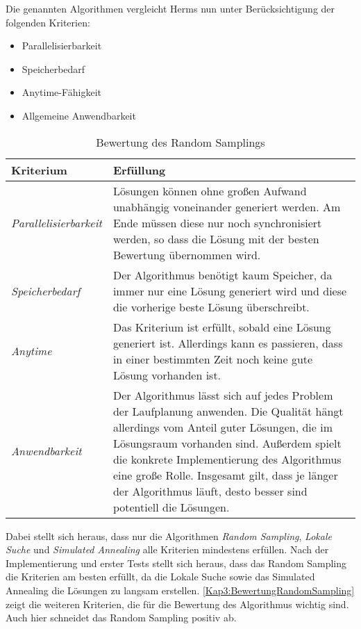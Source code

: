 Die genannten Algorithmen vergleicht Herms nun unter Berücksichtigung der folgenden Kriterien:
\begin{itemize}
  \item Parallelisierbarkeit
  \item Speicherbedarf
  \item Anytime-Fähigkeit
  \item Allgemeine Anwendbarkeit
\end{itemize}

\begin{table}[!t]
  \caption{Bewertung des Random Samplings}
  \label{Kap3:BewertungRandomSampling}
  \renewcommand{\arraystretch}{1.2}
  \centering
  \sffamily
  \begin{footnotesize}
    \begin{tabularx}{0.9\textwidth}{l X}
      \toprule
      \textbf{Kriterium} & \textbf{Erfüllung}\\
      \midrule
      \emph{Parallelisierbarkeit} & Lösungen können ohne großen Aufwand unabhängig voneinander generiert werden. Am Ende müssen diese nur noch synchronisiert werden, so dass die Lösung mit der besten Bewertung übernommen wird.\\
      \emph{Speicherbedarf} & Der Algorithmus benötigt kaum Speicher, da immer nur eine Lösung generiert wird und diese die vorherige beste Lösung überschreibt.\\
      \emph{Anytime} & Das Kriterium ist erfüllt, sobald eine Lösung generiert ist. Allerdings kann es passieren, dass in einer bestimmten Zeit noch keine gute Lösung vorhanden ist.\\
      \emph{Anwendbarkeit} & Der Algorithmus lässt sich auf jedes Problem der Laufplanung anwenden. Die Qualität hängt allerdings vom Anteil guter Lösungen, die im Lösungsraum vorhanden sind. Außerdem spielt die konkrete Implementierung des Algorithmus eine große Rolle. Insgesamt gilt, dass je länger der Algorithmus läuft, desto besser sind potentiell die Lösungen.\\
      \bottomrule
    \end{tabularx}
  \end{footnotesize}
  \rmfamily
\end{table}

Dabei stellt sich heraus, dass nur die Algorithmen \emph{Random Sampling}, \emph{Lokale Suche} und \emph{Simulated Annealing} alle Kriterien mindestens erfüllen. Nach der Implementierung und erster Tests stellt sich heraus, dass das Random Sampling die Kriterien am besten erfüllt, da die Lokale Suche sowie das Simulated Annealing die Lösungen zu langsam erstellen. \autoref{Kap3:BewertungRandomSampling} zeigt die weiteren Kriterien, die für die Bewertung des Algorithmus wichtig sind. Auch hier schneidet das Random Sampling positiv ab.

